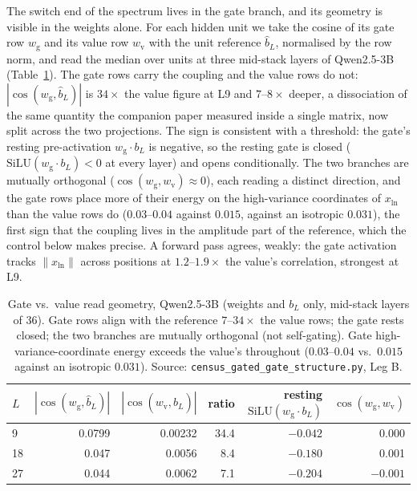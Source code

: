 \documentclass[11pt]{article}
\newcommand{\bl}{b_L}
\newcommand{\blh}{\hat{b}_L}
\newcommand{\wg}{w_{\mathrm{g}}}
\newcommand{\wv}{w_{\mathrm{v}}}
\begin{document}
The switch end of the spectrum lives in the gate branch, and its geometry is
visible in the weights alone. For each hidden unit we take the
cosine of its gate row $\wg$ and its value row $\wv$ with the unit reference
$\blh$, normalised by the row norm, and read the median over units at three
mid-stack layers of Qwen2.5-3B (Table~\ref{tab:geom}). The gate rows carry the
coupling and the value rows do not: $|\cos(\wg,\blh)|$ is $34\times$ the value
figure at L9 and $7$--$8\times$ deeper, a dissociation of the same quantity the
companion paper measured inside a single matrix, now split across the two
projections. The sign is consistent with a threshold: the gate's resting
pre-activation $\wg\!\cdot\!\bl$ is negative, so the resting gate is closed
($\mathrm{SiLU}(\wg\!\cdot\!\bl) < 0$ at every layer) and opens conditionally.
The two branches are mutually orthogonal ($\cos(\wg,\wv)\approx 0$), each reading
a distinct direction, and the gate rows place more of their energy on the
high-variance coordinates of $x_{\mathrm{ln}}$ than the value rows do
($0.03$--$0.04$ against $0.015$, against an isotropic $0.031$), the first sign
that the coupling lives in the amplitude part of the reference, which the control
below makes precise. A forward pass agrees, weakly: the gate activation tracks
$\lVert x_{\mathrm{ln}}\rVert$ across positions at $1.2$--$1.9\times$ the value's
correlation, strongest at L9.

\begin{table}[t]
\centering\small
\begin{tabular}{lrrrrr}
\toprule
$L$ & $|\cos(\wg,\blh)|$ & $|\cos(\wv,\blh)|$ & ratio &
  resting $\mathrm{SiLU}(\wg\!\cdot\!\bl)$ & $\cos(\wg,\wv)$ \\
\midrule
9  & 0.0799 & 0.00232 & 34.4 & $-0.042$ & 0.000 \\
18 & 0.047 & 0.0056 &  8.4 & $-0.180$ & 0.001 \\
27 & 0.044 & 0.0062 &  7.1 & $-0.204$ & $-0.001$ \\
\bottomrule
\end{tabular}
\caption{Gate vs.\ value read geometry, Qwen2.5-3B (weights and $\bl$ only,
mid-stack layers of 36). Gate rows align with the reference $7$--$34\times$ the
value rows; the gate rests closed; the two branches are mutually orthogonal
(not self-gating). Gate high-variance-coordinate energy exceeds the value's
throughout ($0.03$--$0.04$ vs.\ $0.015$ against an isotropic $0.031$).
Source: \texttt{census\_gated\_gate\_structure.py}, Leg B.}
\label{tab:geom}
\end{table}
\end{document}
